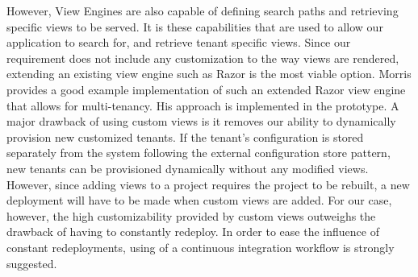 However, View Engines are also capable of defining search paths and retrieving specific views to be served. It is these capabilities that are used to allow our application to search for, and retrieve tenant specific views. Since our requirement does not include any customization to the way views are rendered, extending an existing view engine such as Razor is the most viable option. Morris \cite{Morris} provides a good example implementation of such an extended Razor view engine that allows for multi-tenancy. His approach is implemented in the prototype. A major drawback of using custom views is it removes our ability to dynamically provision new customized tenants. If the tenant's configuration is stored separately from the system following the external configuration store pattern, \cite{Homer2014} new tenants can be provisioned dynamically without any modified views. However, since adding views to a project requires the project to be rebuilt, a new deployment will have to be made when custom views are added. For our case, however, the high customizability provided by custom views outweighs the drawback of having to constantly redeploy. In order to ease the influence of constant redeployments, using of a continuous integration workflow is strongly suggested.


